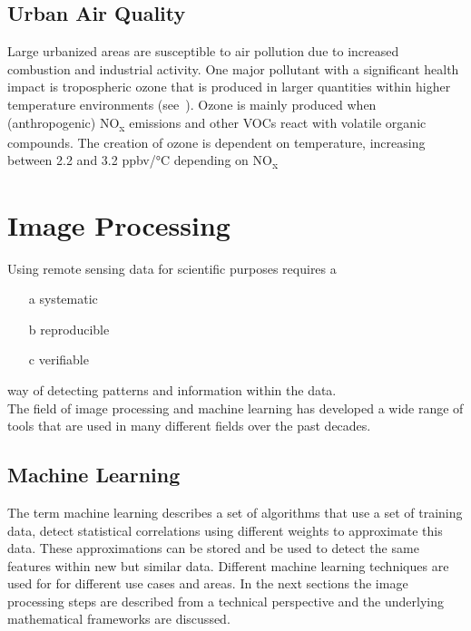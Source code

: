 \documentclass[12pt,a4paper, english,twoside]{article}
\begin{document}
    \subsection{Urban Air Quality}
    Large urbanized areas are susceptible to air pollution due to increased combustion and industrial activity. %
    One major pollutant with a significant health impact is tropospheric ozone that is produced in larger quantities within higher temperature environments (see~\cite{Ebi2008}). 
    Ozone is mainly produced when (anthropogenic) NO\textsubscript{x} emissions and other \glspl{VOC} react with volatile organic compounds. %
    The creation of ozone is dependent on temperature, increasing between 2.2 and 3.2 ppbv/°C depending on NO\textsubscript{x}
  \newpage
\section{Image Processing}\label{sec:imgProcessing}
    Using remote sensing data for scientific purposes requires a 
    \begin{itemize} 
      \item[a] systematic
      \item[b] reproducible
      \item[c] verifiable 
    \end{itemize}%
    way of detecting patterns and information within the data. \\
    The field of image processing and machine learning has developed a wide range of tools that are used in many different fields over the past decades. %

    \subsection{Machine Learning}\label{sec:ml}
      The term machine learning describes a set of algorithms that use a set of training data, detect statistical correlations using different weights to approximate this data. %
      These approximations can be stored and be used to detect the same features within new but similar data.
      Different machine learning techniques are used for for different use cases and areas.
%
      In the next sections the image processing steps are described from a technical perspective and the underlying mathematical frameworks are discussed.
\end{document}

